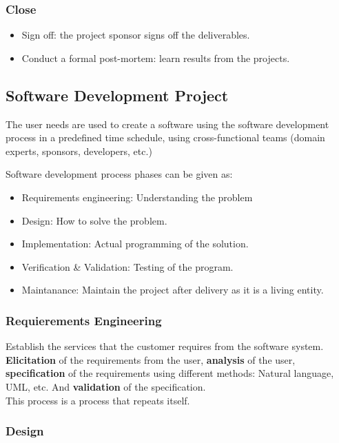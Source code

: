 \documentclass[11pt,a4paper,twocolumn]{book}
\begin{document}
\subsubsection{Close}
\begin{itemize}
\item Sign off: the project sponsor signs off the deliverables.
\item Conduct a formal post-mortem: learn results from the projects.
\end{itemize}

\subsection{Software Development Project}

The user needs are used to create a software using the software development process in a predefined time schedule, using cross-functional teams (domain experts, sponsors, developers, etc.)

Software development process phases can be given as:

\begin{itemize}
\item Requirements engineering: Understanding the problem
\item Design: How to solve the problem.
\item Implementation: Actual programming of the solution.
\item Verification \& Validation: Testing of the program.
\item Maintanance: Maintain the project after delivery as it is a living entity.
\end{itemize}

\subsubsection{Requierements Engineering}

Establish the services that the customer requires from the software system. \textbf{Elicitation} of the requirements from the user, \textbf{analysis} of the user, \textbf{specification} of the requirements using different methods: Natural language, UML, etc. And \textbf{validation} of the specification.\\

This process is a process that repeats itself.

\subsubsection{Design}
\end{document}
